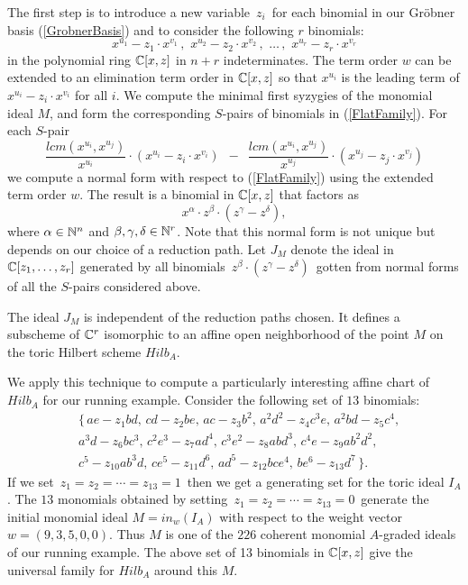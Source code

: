 The first step is to introduce a new variable $ \, z_i \,$ for each 
binomial in our Gr\"obner basis (\ref{GrobnerBasis}) and to consider 
the following $r$ binomials:
\begin{equation}
\label{FlatFamily}
 x^{u_1} -  z_1 \cdot x^{v_1} \,, \,\,
 x^{u_2} - z_2  \cdot x^{v_2} \,,\, \, \ldots \, ,
\,\, x^{u_r} -   z_r \cdot x^{v_r} 
\end{equation}
in the polynomial ring $\mathbb{C}[x,z]$ in  $n+r$ indeterminates.
The term order $w$ can be extended to an elimination term order
in $\mathbb{C}[x,z]$ so that $x^{u_i}$ is the leading term of
$ x^{u_i} -  z_i \cdot x^{v_i} $ for all $i$. 
We compute the minimal first syzygies
of the monomial ideal $M$, and form the
corresponding $S$-pairs of binomials in (\ref{FlatFamily}).
For each $S$-pair
$$
\frac{lcm(x^{u_i},x^{u_j})}{x^{u_i}} \cdot (x^{u_i} - z_i \cdot
x^{v_i} ) \,\,\, - \,\,\, \frac{lcm(x^{u_i},x^{u_j})}{x^{u_j}} \cdot
(x^{u_j} - z_j \cdot x^{v_j}) $$
we compute a normal form with respect
to (\ref{FlatFamily}) using the extended term order $w$.  The result
is a binomial in $\mathbb{C}[x,z]$ that factors as 
$$  x^\alpha \cdot z^\beta \cdot  ( z^\gamma - z^\delta ) , $$
where $\alpha \in \mathbb{N}^n$ and $\beta,\gamma,\delta \in \mathbb{N}^r$.
Note that this normal form is not unique but depends on our
choice of a reduction path.
Let $J_M$ denote the ideal in $\mathbb{C}[z_1 , \ldots, z_r]$ generated by all 
binomials $\, z^\beta \cdot  ( z^\gamma - z^\delta ) \,$
gotten from normal forms of all the $S$-pairs considered above.

\begin{proposition}[\cite{HS:PS2}]\label{localeqns}
The ideal $J_M$ is independent of the reduction paths chosen.
It defines a subscheme of $\mathbb{C}^r$ isomorphic to
an affine open neighborhood of the point $M$ on 
the toric Hilbert scheme $Hilb_A$.
\end{proposition}

We apply this technique to compute a particularly interesting affine
chart of $Hilb_A$ for our running example.
Consider the following set of $13$ binomials:
\begin{eqnarray*}
& \bigl\{ \,a e - z_1 b d ,  \,
 c d - z_2 b e , \,
 a c - z_3 b^2 , \,
 a^2 d^2 - z_4 c^3 e , \,
 a^2 b d - z_5 c^4 , \\ &
 a^3 d - z_6 b c^3 , \,
 c^2 e^3 - z_7 a d^4 , \, 
 c^3 e^2 - z_8 a b d^3 , \,
 c^4 e - z_9 a b^2 d^2 , \\ &
 c^5 - z_{10} a b^3 d , \,
 c e^5 - z_{11} d^6 , \,
 a d^5 - z_{12} b c e^4 , \,
 b e^6 - z_{13} d^7  \, \bigr\}.
\end{eqnarray*}
If we set $\, z_1 = z_2 = \cdots = z_{13} = 1\,$
then we get a generating set for the toric ideal $I_A$.
The $13$ monomials obtained by setting
$\, z_1 = z_2 = \cdots = z_{13} = 0 \,$
generate the initial monomial ideal $ M = in_w (I_A)$
with respect to the weight vector $w = (9, 3, 5, 0, 0)$.
Thus $M$ is one of the $226$ coherent monomial 
$A$-graded ideals of our running example. The above set of 
13 binomials in $\mathbb{C}[x,z]$ give the universal family 
for $Hilb_A$ around this $M$.


